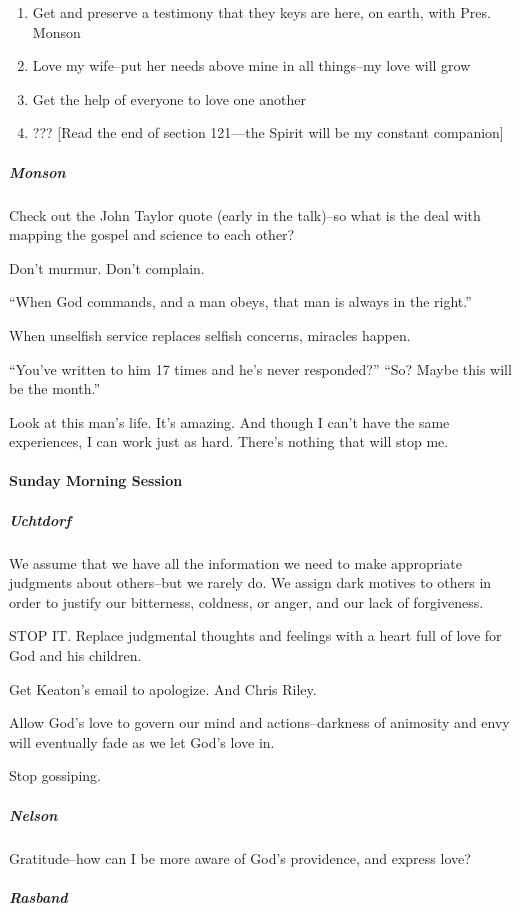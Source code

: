 \begin{enumerate}
\item Get and preserve a testimony that they keys are here, on earth, with Pres. Monson
\item Love my wife--put her needs above mine in all things--my love will grow
\item Get the help of everyone to love one another
\item ??? [Read the end of section 121---the Spirit will be my constant companion]
\end{enumerate}

\subparagraph*{Monson} Check out the John Taylor quote (early in the talk)--so what is the deal with mapping the gospel and science to each other?

Don't murmur. Don't complain.

``When God commands, and a man obeys, that man is always in the right.''

When unselfish service replaces selfish concerns, miracles happen.

``You've written to him 17 times and he's never responded?'' ``So? Maybe this will be the month.''

Look at this man's life. It's amazing. And though I can't have the same experiences, I can work just as hard. There's nothing that will stop me.

\paragraph*{Sunday Morning Session}

\subparagraph*{Uchtdorf} We assume that we have all the information we need to make appropriate judgments about others--but we rarely do. We assign dark motives to others in order to justify our bitterness, coldness, or anger, and our lack of forgiveness.

STOP IT. Replace judgmental thoughts and feelings with a heart full of love for God and his children.

Get Keaton's email to apologize. And Chris Riley.

Allow God's love to govern our mind and actions--darkness of animosity and envy will eventually fade as we let God's love in.

Stop gossiping.

\subparagraph*{Nelson} Gratitude--how can I be more aware of God's providence, and express love?

\subparagraph*{Rasband}

